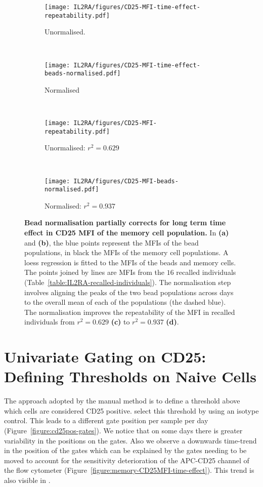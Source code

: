 \begin{figure}[ht]
\centering
\begin{subfigure}[b]{.4\textwidth}
    \centering
    \texttt{[image: IL2RA/figures/CD25-MFI-time-effect-repeatability.pdf]}
    \caption{Unormalised.}
\end{subfigure}
~
\begin{subfigure}[b]{.4\textwidth}
    \centering
    \texttt{[image: IL2RA/figures/CD25-MFI-time-effect-beads-normalised.pdf]}
    \caption{Normalised}
\end{subfigure}
~
\begin{subfigure}[b]{.4\textwidth}
    \centering
    \texttt{[image: IL2RA/figures/CD25-MFI-repeatability.pdf]}
    \caption{Unormalised: $r^2=0.629$}
\end{subfigure}
~
\begin{subfigure}[b]{.4\textwidth}
    \centering
    \texttt{[image: IL2RA/figures/CD25-MFI-beads-normalised.pdf]}
    \caption{Normalised: $r^2=0.937$}
\end{subfigure}
\caption{
\label{figure:CD25-MFI-beads-normalised}
\textbf{Bead normalisation partially corrects for long term time effect in CD25 MFI of the memory cell population.}
In \textbf{(a)} and \textbf{(b)}, the blue points represent the MFIs of the bead populations, in black the MFIs of the memory cell populations.
A loess regression is fitted to the MFIs of the beads and memory cells.
The points joined by lines are MFIs from the $16$ recalled individuals (Table~\ref{table:IL2RA-recalled-individuals}).
The normalisation step involves aligning the peaks of the two bead populations across days to the overall mean of each of the populations (the dashed blue).
The normalisation improves the repeatability of the MFI in recalled individuals from $r^2=0.629$ \textbf{(c)} to $r^2=0.937$ \textbf{(d)}.
}
\end{figure}




\section{Univariate Gating on CD25: Defining Thresholds on Naive Cells}

The approach adopted by the manual method is to define a threshold above which cells are considered CD25 positive.
\citet{Dendrou:2009bl} select this threshold by using an isotype control.
This leads to a different gate position per sample per day (Figure~\ref{figure:cd25pos-gates}).
We notice that on some days there is greater variability in the positions on the gates.
Also we observe a downwards time-trend in the position of the gates which can be explained by
the gates needing to be moved to account for the sensitivity deterioration of the APC-CD25 channel of the
flow cytometer (Figure~\ref{figure:memory-CD25MFI-time-effect}).
This trend is also visible in \citet{Dendrou:2009bl}.

